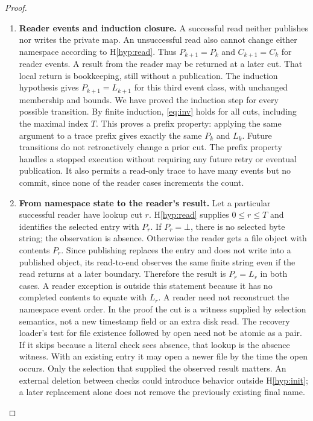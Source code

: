 \documentclass[12pt]{article}
\newcommand{\absent}{\bot}
\begin{document}
\begin{proof}
\begin{enumerate}
\item \textbf{Reader events and induction closure.}
A successful read neither publishes nor writes the private map.
An unsuccessful read also cannot change either namespace
according to H\ref{hyp:read}.
Thus $P_{k+1}=P_k$ and $C_{k+1}=C_k$ for reader events.
A result from the reader may be returned at a later cut.
That local return is bookkeeping, still without a publication.
The induction hypothesis gives $P_{k+1}=L_{k+1}$ for
this third event class, with unchanged membership and bounds.
We have proved the induction step for every possible transition.
By finite induction, \eqref{eq:inv} holds for all cuts,
including the maximal index $T$.
This proves a prefix property: applying the same argument
to a trace prefix gives exactly the same $P_k$ and $L_k$.
Future transitions do not retroactively change a prior cut.
The prefix property handles a stopped execution without
requiring any future retry or eventual publication.
It also permits a read-only trace to have many events but
no commit, since none of the reader cases increments the count.


\item \textbf{From namespace state to the reader's result.}
Let a particular successful reader have lookup cut $r$.
H\ref{hyp:read} supplies $0\leq r\leq T$ and identifies
the selected entry with $P_r$. If $P_r=\absent$, there is
no selected byte string; the observation is absence.
Otherwise the reader gets a file object with contents $P_r$.
Since publishing replaces the entry and does not write into
a published object, its read-to-end observes the same finite
string even if the read returns at a later boundary.
Therefore the result is $P_r=L_r$ in both cases.
A reader exception is outside this statement because it has
no completed contents to equate with $L_r$.
A reader need not reconstruct the namespace event order.
In the proof the cut is a witness supplied by selection semantics,
not a new timestamp field or an extra disk read.
The recovery loader's test for file existence followed by open
need not be atomic as a pair.
If it skips because a literal check sees absence, that lookup
is the absence witness. With an existing entry it may open a
newer file by the time the open occurs.
Only the selection that supplied the observed result matters.
An external deletion between checks could introduce behavior
outside H\ref{hyp:init}; a later replacement alone does not
remove the previously existing final name.


\end{enumerate}
\end{proof}
\end{document}
